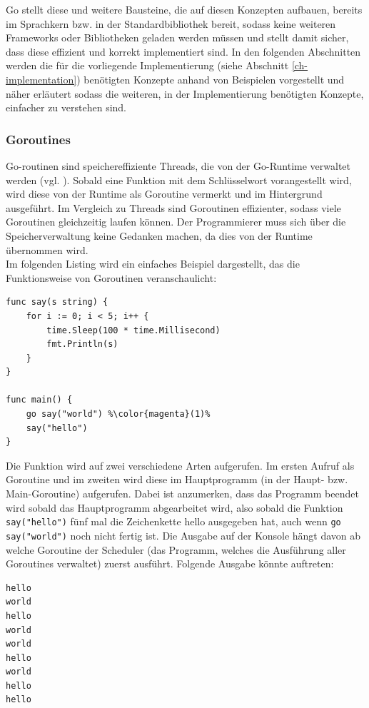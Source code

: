 \noindent
Go stellt diese und weitere Bausteine, die auf diesen Konzepten aufbauen, bereits im Sprachkern bzw. in der Standardbibliothek bereit, sodass keine weiteren Frameworks oder Bibliotheken geladen werden müssen und stellt damit sicher, dass diese effizient und korrekt implementiert sind. In den folgenden Abschnitten werden die für die vorliegende Implementierung (siehe Abschnitt \ref{ch-implementation}) benötigten Konzepte anhand von Beispielen vorgestellt und näher erläutert sodass die weiteren, in der Implementierung benötigten Konzepte, einfacher zu verstehen sind.    

\subsubsection{Goroutines}
Go-routinen sind speichereffiziente Threads, die von der Go-Runtime verwaltet werden (vgl. \cite{go:goroutines}). Sobald eine Funktion mit dem Schlüsselwort  vorangestellt wird, wird diese von der Runtime als Goroutine vermerkt und im Hintergrund ausgeführt. Im Vergleich zu Threads sind Goroutinen effizienter, sodass viele Goroutinen gleichzeitig laufen können. Der Programmierer muss sich über die Speicherverwaltung keine Gedanken machen, da dies von der Runtime übernommen wird.\\ Im folgenden Listing wird ein einfaches Beispiel dargestellt, das die Funktionsweise von Goroutinen veranschaulicht: 
\begin{lstlisting}[style=goMono,caption={Beispiel Goroutine},label={lst:go:sync:concurrency:ex1}]
func say(s string) {
	for i := 0; i < 5; i++ {
		time.Sleep(100 * time.Millisecond)
		fmt.Println(s)
	}
}

func main() {
	go say("world") %\color{magenta}(1)%
	say("hello")
}
\end{lstlisting}
Die Funktion \frqq{}\frqq{} wird auf zwei verschiedene Arten aufgerufen. Im ersten Aufruf als Goroutine  und im zweiten wird diese im Hauptprogramm (in der Haupt- bzw. Main-Goroutine) aufgerufen. Dabei ist anzumerken, dass das Programm beendet wird sobald das Hauptprogramm abgearbeitet wird, also sobald die Funktion \verb|say("hello")| fünf mal die Zeichenkette \frqq{}hello\flqq{} ausgegeben hat, auch wenn \verb|go say("world")| noch nicht fertig ist. Die Ausgabe auf der Konsole hängt davon ab welche Goroutine der Scheduler (das Programm, welches die Ausführung aller Goroutines verwaltet) zuerst ausführt. Folgende Ausgabe könnte auftreten:
\begin{lstlisting}[style=goMono,caption={Beispiel Goroutine},label={lst:go:sync:concurrency:ex1:output}]
hello
world
hello
world
world
hello
world
hello
hello
\end{lstlisting}
